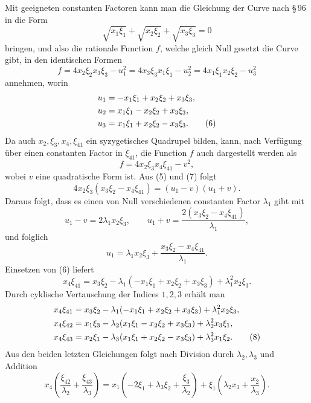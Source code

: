 \documentclass[11pt]{article}
\begin{document}
Mit geeigneten constanten Factoren kann man die Gleichung der Curve nach \S\,96 in die Form
\begin{equation}
 \sqrt{x_1\xi_1}+\sqrt{x_2\xi_2}+\sqrt{x_3\xi_3}=0
 \tag{4}
\end{equation}
bringen, und also die rationale Function \(f\), welche gleich Null gesetzt die Curve gibt, in den identischen Formen
\begin{equation}
 f=4x_2\xi_2x_3\xi_3-u_1^2
  =4x_3\xi_3x_1\xi_1-u_2^2
  =4x_1\xi_1x_2\xi_2-u_3^2
 \tag{5}
\end{equation}
annehmen, worin
\begin{align}
 u_1&=-x_1\xi_1+x_2\xi_2+x_3\xi_3,\notag\\
 u_2&= x_1\xi_1-x_2\xi_2+x_3\xi_3,\notag\\
 u_3&= x_1\xi_1+x_2\xi_2-x_3\xi_3.
 \tag{6}
\end{align}
Da auch \(x_2,\xi_3,x_4,
\xi_{41}\) ein syzygetisches Quadrupel bilden, kann, nach Verfügung über einen constanten Factor in \(\xi_{41}\), die Function \(f\) auch dargestellt werden als
\begin{equation}
 f=4x_2\xi_3x_4\xi_{41}-v^2,
 \tag{7}
\end{equation}
wobei \(v\) eine quadratische Form ist. Aus (5) und (7) folgt
\[
 4x_2\xi_3(x_3\xi_2-x_4\xi_{41})=(u_1-v)(u_1+v).
\]
Daraus folgt, dass es einen von Null verschiedenen constanten Factor \(\lambda_1\) gibt mit
\[
 u_1-v=2\lambda_1x_2\xi_3,
 \qquad
 u_1+v=\frac{2(x_3\xi_2-x_4\xi_{41})}{\lambda_1},
\]
und folglich
\[
 u_1=\lambda_1x_2\xi_3+\frac{x_3\xi_2-x_4\xi_{41}}{\lambda_1}.
\]
Einsetzen von (6) liefert
\begin{equation}
 x_4\xi_{41}=x_3\xi_2-
 \lambda_1(-x_1\xi_1+x_2\xi_2+x_3\xi_3)+\lambda_1^2x_2\xi_3.
 \tag{8a}
\end{equation}
Durch cyklische Vertauschung der Indices \(1,2,3\) erhält man
\begin{align}
 x_4\xi_{41}&=x_3\xi_2-
 \lambda_1(-x_1\xi_1+x_2\xi_2+x_3\xi_3)+\lambda_1^2x_2\xi_3,\notag\\
 x_4\xi_{42}&=x_1\xi_3-
 \lambda_2( x_1\xi_1-x_2\xi_2+x_3\xi_3)+\lambda_2^2x_3\xi_1,\notag\\
 x_4\xi_{43}&=x_2\xi_1-
 \lambda_3( x_1\xi_1+x_2\xi_2-x_3\xi_3)+\lambda_3^2x_1\xi_2.
 \tag{8}
\end{align}
Aus den beiden letzten Gleichungen folgt nach Division durch \(\lambda_2,\lambda_3\) und Addition
\begin{equation}
 x_4\left(\frac{\xi_{42}}{\lambda_2}+\frac{\xi_{43}}{\lambda_3}\right)
 =x_1\left(-2\xi_1+\lambda_3\xi_2+\frac{\xi_3}{\lambda_2}\right)
 +\xi_1\left(\lambda_2x_3+\frac{x_2}{\lambda_3}\right).
 \tag{9}
\end{equation}
\end{document}
